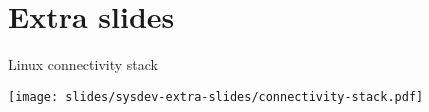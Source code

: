 \section{Extra slides}

\begin{frame}{Linux connectivity stack}
  \begin{center}
    \texttt{[image: slides/sysdev-extra-slides/connectivity-stack.pdf]}
  \end{center}
\end{frame}
